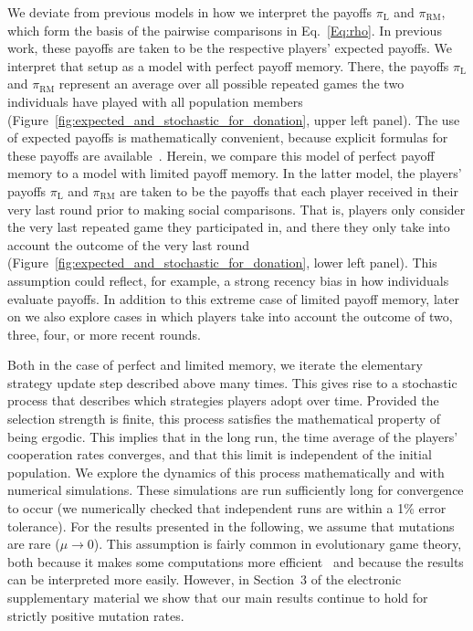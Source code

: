\documentclass[11pt]{article}
\def\rolemodel{\text{RM}}
\def\learner{\text{L}}
\def\esm{electronic supplementary material}
\newcommand{\FigBaseResults}{Figure~\ref{fig:expected_and_stochastic_for_donation}}
\theoremstyle{plainCl1}
\theoremstyle{plainCl2}
\begin{document}
We deviate from previous models in how we interpret the payoffs $\pi_\learner$ and $\pi_\rolemodel$, which form the basis of the pairwise comparisons in Eq.~\eqref{Eq:rho}. 
In previous work, these payoffs are taken to be the respective players' expected payoffs. 
We interpret that setup as a model with perfect payoff memory. 
There, the payoffs  $\pi_\learner$ and $\pi_\rolemodel$ represent an average over all possible repeated games the two individuals have played with all population members (\FigBaseResults, upper left panel). 
The use of expected payoffs is mathematically convenient, because explicit formulas for these payoffs are available~\citep{hofbauer1998evolutionary}.
Herein, we compare this model of perfect payoff memory to a model with limited payoff memory. 
In the latter model, the players' payoffs $\pi_\learner$ and $\pi_\rolemodel$ are taken to be the payoffs that each player received in their very last round prior to making social comparisons. 
That is, players only consider the very last repeated game they participated in, and there they only take into account the outcome of the very last round (\FigBaseResults, lower left panel). 
This assumption could reflect, for example, a strong recency bias in how individuals evaluate payoffs.  
In addition to this extreme case of limited payoff memory, later on we also explore cases in which players take into account the outcome of two, three, four, or more recent rounds. 


Both in the case of perfect and limited memory, we iterate the elementary strategy update step described above many times. 
This gives rise to a stochastic process that describes which strategies players adopt over time. 
Provided the selection strength is finite, this process satisfies the mathematical property of being ergodic. 
This implies that in the long run, the time average of the players' cooperation rates converges, and that this limit is independent of the initial population. 
We explore the dynamics of this process mathematically and with numerical simulations.
These simulations are run sufficiently long for convergence to occur (we numerically checked that independent runs are within a 1\% error tolerance). 
For the results presented in the following, we assume that mutations are rare (\(\mu\!\rightarrow\! 0\)). 
This assumption is fairly common in evolutionary game theory, both because it makes some computations more efficient~\citep{fudenberg:JET:2006,wu:JMB:2012,mcavoy:jet:2015} and because the results can be interpreted more easily.  
However, in Section~3 of the \esm{} we show that our main results continue to hold for strictly positive mutation rates.
\end{document}
